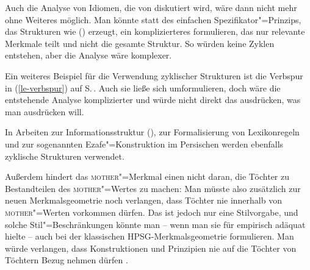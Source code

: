 Auch die Analyse von Idiomen, die von \citet{SS2003a}
diskutiert wird, wäre dann nicht mehr ohne Weiteres möglich. Man könnte statt des einfachen
Spezifikator"=Prinzips, das Strukturen wie () erzeugt, ein komplizierteres formulieren, das
nur relevante Merkmale teilt und nicht die gesamte Struktur.
So würden keine Zyklen entstehen, aber
die Analyse wäre komplexer. 

Ein weiteres Beispiel für die Verwendung zyklischer Strukturen ist die Verbspur in
(\ref{le-verbspur}) auf S.\,\pageref{le-verbspur}. Auch sie ließe sich umformulieren, doch wäre
die entstehende Analyse komplizierter und würde nicht direkt das ausdrücken, was man ausdrücken will.%

In Arbeiten zur Informationsstruktur (\citealp[]{EV94a}), zur
Formalisierung von Lexikonregeln \citep[]{Meurers2001a} und zur
sogenannten Ezafe"=Konstruktion im Persischen \citep[]{Samvelian2007a} werden
ebenfalls zyklische Strukturen verwendet.



Außerdem hindert das \textsc{mother}"=Merkmal einen nicht daran, die Töchter zu Bestandteilen des \textsc{mother}"=Wertes zu machen:
\ea
\label{sb-cxg-daughters-in-mother}
\z
Man müsste also zusätzlich zur neuen Merkmalsgeometrie noch verlangen, dass Töchter nie innerhalb
von \textsc{mother}"=Werten vorkommen dürfen. Das ist jedoch nur eine Stilvorgabe, und solche
Stil"=Beschränkungen könnte man -- wenn man sie für empirisch adäquat hielte -- auch bei der
klassischen HPSG-Merkmalsgeometrie formulieren. Man würde verlangen, dass Konstruktionen und Prinzipien nie auf die
Töchter von Töchtern Bezug nehmen dürfen \citep[143--145]{ps}.

